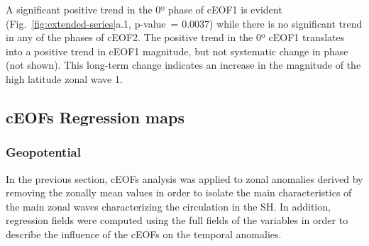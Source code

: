 \documentclass[pdflatex,sn-basic]{sn-jnl}
\theoremstyle{thmstyleone}%
\theoremstyle{thmstyletwo}%
\theoremstyle{thmstylethree}%
\begin{document}
A significant positive trend in the 0º phase of cEOF1 is evident (Fig.~\ref{fig:extended-series}a.1, p-value~= 0.0037) while there is no significant trend in any of the phases of cEOF2.
The positive trend in the 0º cEOF1 translates into a positive trend in cEOF1 magnitude, but not systematic change in phase (not shown).
This long-term change indicates an increase in the magnitude of the high latitude zonal wave 1.

\hypertarget{regressions}{%
\subsection{cEOFs Regression maps}\label{regressions}}

\hypertarget{geopotential}{%
\subsubsection{Geopotential}\label{geopotential}}

In the previous section, cEOFs analysis was applied to zonal anomalies derived by removing the zonally mean values in order to isolate the main characteristics of the main zonal waves characterizing the circulation in the SH.
In addition, regression fields were computed using the full fields of the variables in order to describe the influence of the cEOFs on the temporal anomalies.
\end{document}
